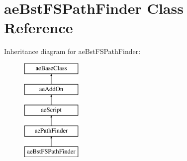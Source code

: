 \hypertarget{classae_bst_f_s_path_finder}{}\section{ae\+Bst\+F\+S\+Path\+Finder Class Reference}
\label{classae_bst_f_s_path_finder}
Inheritance diagram for ae\+Bst\+F\+S\+Path\+Finder\+:\begin{figure}[H]
\begin{center}
\leavevmode
\includegraphics[height=5.000000cm]{classae_bst_f_s_path_finder}
\end{center}
\end{figure}
